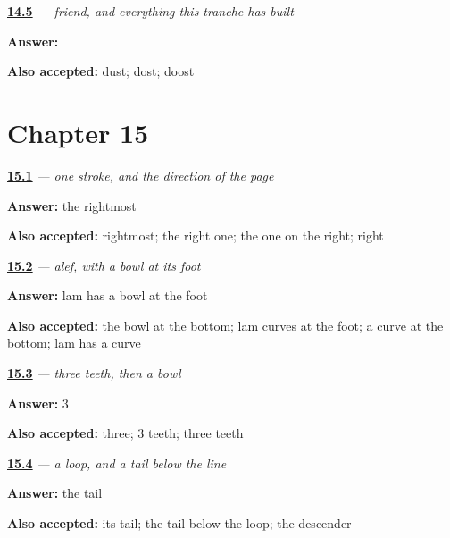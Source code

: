\noindent\begin{minipage}[t]{\linewidth}
\raggedright
\hyperlink{review-FA-C14-dust-meaning}{\textbf{14.5}} \emph{ — friend, and everything this tranche has built}\par
\small \textbf{Answer:} \par
\footnotesize \textbf{Also accepted:} dust; dost; doost
\end{minipage}\par\medskip

\section*{Chapter 15}

\noindent\begin{minipage}[t]{\linewidth}
\raggedright
\hyperlink{review-FA-W15-alef-direction}{\textbf{15.1}} \emph{ — one stroke, and the direction of the page}\par
\small \textbf{Answer:} the rightmost\par
\footnotesize \textbf{Also accepted:} rightmost; the right one; the one on the right; right
\end{minipage}\par\medskip

\noindent\begin{minipage}[t]{\linewidth}
\raggedright
\hyperlink{review-FA-W15-lam-vs-alef}{\textbf{15.2}} \emph{ — alef, with a bowl at its foot}\par
\small \textbf{Answer:} lam has a bowl at the foot\par
\footnotesize \textbf{Also accepted:} the bowl at the bottom; lam curves at the foot; a curve at the bottom; lam has a curve
\end{minipage}\par\medskip

\noindent\begin{minipage}[t]{\linewidth}
\raggedright
\hyperlink{review-FA-W15-sin-teeth}{\textbf{15.3}} \emph{ — three teeth, then a bowl}\par
\small \textbf{Answer:} 3\par
\footnotesize \textbf{Also accepted:} three; 3 teeth; three teeth
\end{minipage}\par\medskip

\noindent\begin{minipage}[t]{\linewidth}
\raggedright
\hyperlink{review-FA-W15-mim-tail}{\textbf{15.4}} \emph{ — a loop, and a tail below the line}\par
\small \textbf{Answer:} the tail\par
\footnotesize \textbf{Also accepted:} its tail; the tail below the loop; the descender
\end{minipage}\par\medskip

